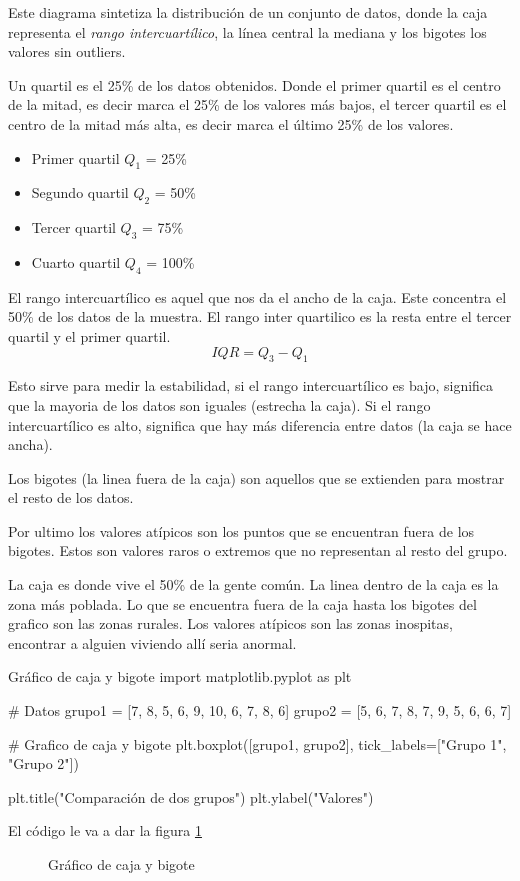 Este diagrama sintetiza la distribución de un conjunto de datos, donde la caja representa el \textit{rango intercuartílico}, la línea central la mediana y los bigotes los valores sin outliers.

Un quartil es el 25\% de los datos obtenidos. Donde el primer quartil es el centro de la mitad, es decir marca el 25\% de los valores más bajos, el tercer quartil es el centro de la mitad más alta, es decir marca el último 25\% de los valores.

\begin{itemize}
    \item Primer quartil \(Q_1\) = 25\%
    \item Segundo quartil \(Q_2\) = 50\%
    \item Tercer quartil \(Q_3\) = 75\%
    \item Cuarto quartil \(Q_4\) = 100\%
\end{itemize}

El rango intercuartílico es aquel que nos da el ancho de la caja. Este concentra el 50\% de los datos de la muestra. El rango inter quartilico es la resta entre el tercer quartil y el primer quartil.
\[
IQR = Q_3-Q_1
\]

Esto sirve para medir la estabilidad, si el rango intercuartílico es bajo, significa que la mayoria de los datos son iguales (estrecha la caja). Si el rango intercuartílico es alto, significa que hay más diferencia entre datos (la caja se hace ancha).

Los bigotes (la linea fuera de la caja) son aquellos que se extienden para mostrar el resto de los datos.

Por ultimo los valores atípicos son los puntos que se encuentran fuera de los bigotes. Estos son valores raros o extremos que no representan al resto del grupo.

\begin{ejemplo}
    La caja es donde vive el 50\% de la gente común.
    La linea dentro de la caja es la zona más poblada.
    Lo que se encuentra fuera de la caja hasta los bigotes del grafico son las zonas rurales.
    Los valores atípicos son las zonas inospitas, encontrar a alguien viviendo allí seria anormal.
\end{ejemplo}

\begin{pycode}{Gráfico de caja y bigote}
import matplotlib.pyplot as plt

# Datos
grupo1 = [7, 8, 5, 6, 9, 10, 6, 7, 8, 6]
grupo2 = [5, 6, 7, 8, 7, 9, 5, 6, 6, 7]

# Grafico de caja y bigote
plt.boxplot([grupo1, grupo2], tick_labels=["Grupo 1", "Grupo 2"])

plt.title("Comparación de dos grupos")
plt.ylabel("Valores")    
\end{pycode}

El código le va a dar la figura \ref{fig:grafico_simple_boxplot}

\begin{figure}[ht]
    \centering
     
    \caption{Gráfico de caja y bigote}
    \label{fig:grafico_simple_boxplot}
\end{figure}